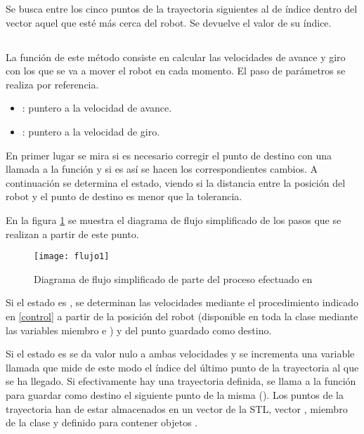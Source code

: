 \noindent
Se busca entre los cinco puntos de la trayectoria siguientes al de índice  dentro del vector  aquel que esté más cerca del robot. Se devuelve el valor de su índice.

\subsection{}

\noindent
{}

\noindent
La función de este método consiste en calcular las velocidades de avance y giro con los que se va a mover el robot en cada momento. El paso de parámetros se realiza por referencia.

\begin{itemize}
  \item {}: puntero a la velocidad de avance.
  \item {}: puntero a la velocidad de giro.
\end{itemize}

\noindent
En primer lugar se mira si es necesario corregir el punto de destino con una llamada a la función  y si es así se hacen los correspondientes cambios. A continuación se determina el estado, viendo si la distancia entre la posición del robot y el punto de destino es menor que la tolerancia.

En la figura \ref{fg:flujo1} se muestra el diagrama de flujo simplificado de los pasos que se realizan a partir de este punto.

\begin{figure}[htb]
  \centering\texttt{[image: flujo1]}\\
  \caption{Diagrama de flujo simplificado de parte del proceso efectuado en }\label{fg:flujo1}
\end{figure}

Si el estado es , se determinan las velocidades mediante el procedimiento indicado en \ref{control} a partir de la posición del robot (disponible en toda la clase mediante las variables miembro  e ) y del punto guardado como destino.

Si el estado es  se da valor nulo a ambas velocidades y se incrementa una variable llamada  que mide de este modo el índice del último punto de la trayectoria al que se ha llegado. Si efectivamente hay una trayectoria definida, se llama a la función  para guardar como destino el siguiente punto de la misma (). Los puntos de la trayectoria han de estar almacenados en un vector de la STL, vector , miembro de la clase y definido para contener objetos .

